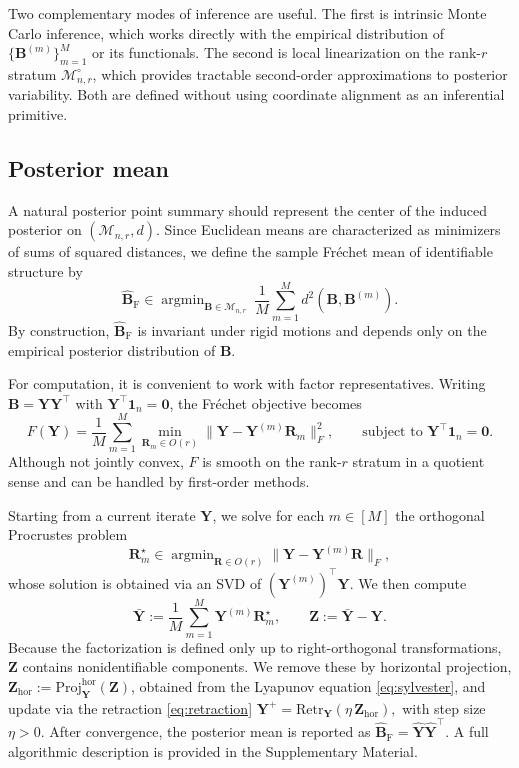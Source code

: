 \documentclass[12pt]{article}
\DeclareMathOperator*{\argmin}{argmin}
\newcommand{\calMnr}{\mathcal{M}_{n,r}}
\newcommand{\calMnro}{\mathcal{M}^{\circ}_{n,r}} %
\newcommand{\bfB}{\boldsymbol{B}}
\newcommand{\bfR}{\boldsymbol{R}}
\newcommand{\bfY}{\boldsymbol{Y}}
\newcommand{\bfZ}{\boldsymbol{Z}}
\newcommand{\bfone}{\boldsymbol{1}}
\newcommand{\bfzero}{\boldsymbol{0}}
\newcommand{\Frechet}{Fr\'{e}chet\xspace}
\newcommand{\BhatF}{\widehat{\bfB}_{\mathrm{F}}}
\begin{document}
Two complementary modes of inference are useful. The first is intrinsic Monte Carlo inference,
which works directly with the empirical distribution of $\{\bfB^{(m)}\}_{m=1}^M$ or its functionals.
The second is local linearization on the rank-$r$ stratum $\calMnro$, which provides tractable
second-order approximations to posterior variability. Both are defined without using coordinate
alignment as an inferential primitive.

\subsection{Posterior mean}\label{subsec:mean}

A natural posterior point summary should represent the center of the induced posterior on
$(\calMnr,d)$. Since Euclidean means are characterized as minimizers of sums of squared distances,
we define the sample \Frechet mean of identifiable structure by
\begin{equation}\label{eq:frechet-mean}
\BhatF \in \argmin_{\bfB\in\calMnr}\ \frac{1}{M}\sum_{m=1}^M d^2(\bfB,\bfB^{(m)}).
\end{equation}
By construction, $\BhatF$ is invariant under rigid motions and depends only on the empirical
posterior distribution of $\bfB$.

For computation, it is convenient to work with factor representatives. Writing
$\bfB=\bfY\bfY^\top$ with $\bfY^\top\bfone_n=\bfzero$, the \Frechet objective becomes
\[
F(\bfY)
=
\frac{1}{M}\sum_{m=1}^M
\min_{\bfR_m\in O(r)} \|\bfY-\bfY^{(m)}\bfR_m\|_F^2,
\qquad \text{subject to }\bfY^\top\bfone_n=\bfzero.
\]
Although not jointly convex, $F$ is smooth on the rank-$r$ stratum in a quotient sense and can be
handled by first-order methods.

Starting from a current iterate $\bfY$, we solve for each $m\in[M]$ the orthogonal Procrustes
problem
\[
\bfR_m^\star \in \argmin_{\bfR\in O(r)}\|\bfY-\bfY^{(m)}\bfR\|_F,
\]
whose solution is obtained via an SVD of $(\bfY^{(m)})^\top\bfY$. We then compute
\[
\bar{\bfY} := \frac{1}{M}\sum_{m=1}^M \bfY^{(m)}\bfR_m^\star,\qquad
\bfZ := \bar{\bfY}-\bfY.
\]
Because the factorization is defined only up to right-orthogonal transformations, $\bfZ$ contains
nonidentifiable components. We remove these by horizontal projection,
$\bfZ_{\mathrm{hor}} := \mathrm{Proj}^{\mathrm{hor}}_{\bfY}(\bfZ)$, obtained from the Lyapunov
equation \eqref{eq:sylvester}, and update via the retraction \eqref{eq:retraction}
$
\bfY^+ = \mathrm{Retr}_{\bfY}(\eta\,\bfZ_{\mathrm{hor}}),
$
with step size $\eta>0$. After convergence, the posterior mean is reported as
$
\BhatF=\hat{\bfY}\hat{\bfY}^\top.
$ A full algorithmic description is provided in the Supplementary Material.
\end{document}
